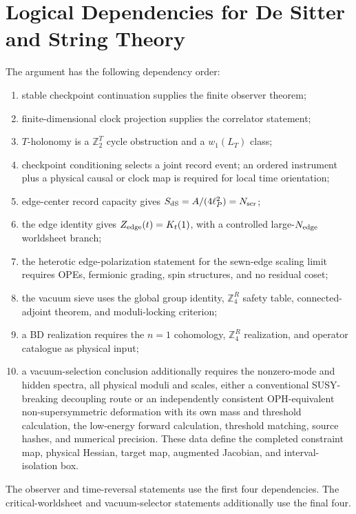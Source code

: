 \documentclass[11pt]{article}
\theoremstyle{remark}
\theoremstyle{plain}
\newcommand{\Z}{\mathbb Z}
\newcommand{\ZfourR}{\mathbb Z_4^R}
\begin{document}
\section{Logical Dependencies for De Sitter and String Theory}

The argument has the following dependency order:
\begin{enumerate}[leftmargin=2em]
\item stable checkpoint continuation supplies the finite observer theorem;
\item finite-dimensional clock projection supplies the correlator statement;
\item \(T\)-holonomy is a \(\Z_2^T\) cycle obstruction and a \(w_1(L_T)\) class;
\item checkpoint conditioning selects a joint record event; an ordered
instrument plus a physical causal or clock map is required for local time orientation;
\item edge-center record capacity gives \(S_{\rm dS}=A/(4\ell_P^2)=N_{\rm scr}\);
\item the edge identity gives \(Z_{\rm edge}(t)=K_t(1)\), with a controlled
large-\(N_{\rm edge}\) worldsheet branch;
\item the heterotic edge-polarization statement for the sewn-edge scaling limit requires
OPEs, fermionic grading, spin structures, and no residual coset;
\item the vacuum sieve uses the global group identity, \(\ZfourR\) safety table,
connected-adjoint theorem, and moduli-locking criterion;
\item a BD realization requires the \(n=1\) cohomology, \(\ZfourR\) realization, and operator
catalogue as physical input;
\item a vacuum-selection conclusion additionally requires the nonzero-mode and hidden spectra,
all physical moduli and scales, either a
conventional SUSY-breaking decoupling route or an independently consistent OPH-equivalent
non-supersymmetric deformation with its own mass and threshold calculation, the low-energy forward calculation, threshold matching,
source hashes, and numerical precision. These data define the completed constraint map,
physical Hessian, target map, augmented Jacobian, and interval-isolation box.
\end{enumerate}

The observer and time-reversal statements use the first four dependencies. The
critical-worldsheet and vacuum-selector statements additionally use the final four.
\end{document}
